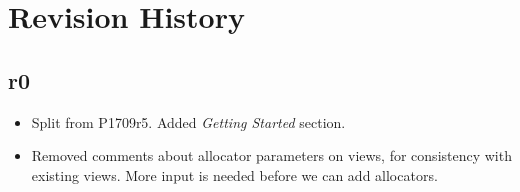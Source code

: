 \section{Revision History}

\subsection*{\paperno r0}

\begin{itemize}
      \item Split from P1709r5. Added \textit{Getting Started} section.
      \item Removed comments about allocator parameters on views, for consistency with existing views. 
            More input is needed before we can add allocators.
\end{itemize}
